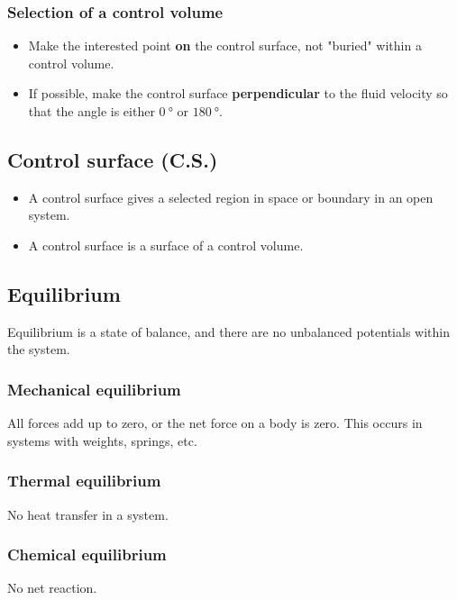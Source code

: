 \documentclass[11pt]{article}
\begin{document}
\subsubsection{Selection of a control volume}
\label{sec:org08fdeff}
\begin{itemize}
\item Make the interested point \textbf{on} the control surface, not "buried" within a control volume.
\item If possible, make the control surface \textbf{perpendicular} to the fluid velocity so that the angle is either \(\qty{0}{\degree}\) or \(\qty{180}{\degree}\).
\end{itemize}

\subsection{Control surface (C.S.)}
\label{sec:org18d6164}
\begin{itemize}
\item A control surface gives a selected region in space or boundary in an open system.
\item A control surface is a surface of a control volume.
\end{itemize}

\subsection{Equilibrium}
\label{sec:org5800c36}
Equilibrium is a state of balance, and there are no unbalanced potentials within the system.

\subsubsection{Mechanical equilibrium}
\label{sec:orgfed659f}
All forces add up to zero, or the net force on a body is zero. This occurs in systems with weights, springs, etc.

\subsubsection{Thermal equilibrium}
\label{sec:orgce738e6}
No heat transfer in a system.

\subsubsection{Chemical equilibrium}
\label{sec:orgfe59c19}
No net reaction.
\end{document}
